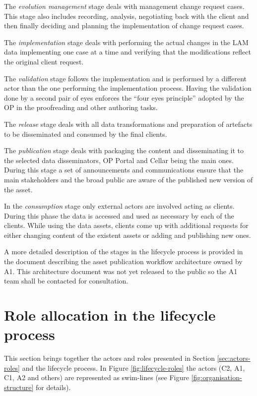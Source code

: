 	The \textit{evolution management} stage deals with management change request cases. This stage also includes recording, analysis, negotiating back with the client and then finally deciding and planning the implementation of change request cases.
	
	The \textit{implementation} stage deals with performing the actual changes in the LAM data implementing one case at a time and verifying that the modifications reflect the original client request.
	
	The \textit{validation} stage follows the implementation and is performed by a different actor than the one performing the implementation process. Having the validation done by a second pair of eyes enforces the ``four eyes principle'' adopted by the OP in the proofreading and other authoring tasks. 
	
	The \textit{release} stage deals with all data transformations and preparation of artefacts to be disseminated and consumed by the final clients. 
		
	The \textit{publication} stage deals with packaging the content and disseminating it to the selected data disseminators, OP Portal and Cellar being the main ones. During this stage a set of announcements and communications ensure that the main stakeholders and the broad public are aware of the published new version of the asset.
	
	In the \textit{consumption} stage only external actors are involved acting as clients. During this phase the data is accessed and used as necessary by each of the clients. While using the data assets, clients come up with additional requests for either changing content of the existent assets or adding and publishing new ones.
	
	A more detailed description of the stages in the lifecycle process is provided in the document describing the asset publication workflow architecture \citep{costetchi2020d} owned by A1. This architecture document was not yet released to the public so the A1 team shall be contacted for consultation.
	
	\section{Role allocation in the lifecycle process}
	
	This section brings together the actors and roles presented in Section \ref{sec:actors-roles} and the lifecycle process. In Figure \ref{fig:lifecycle-roles} the actors (C2, A1, C1, A2 and others) are represented as swim-lines (see Figure \ref{fig:organisation-structure} for details). 
	
